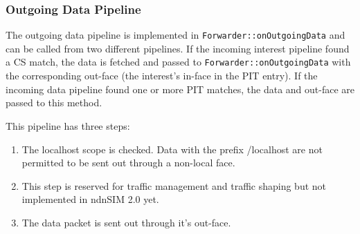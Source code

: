 \subsubsection{Outgoing Data Pipeline}

The outgoing data pipeline is implemented in \texttt{Forwarder::onOutgoingData} and can be called from two different pipelines. If the incoming interest pipeline found a CS match, the data is fetched and passed to \texttt{Forwarder::onOutgoingData} with the corresponding out-face (the interest's in-face in the PIT entry). If the incoming data pipeline found one or more PIT matches, the data and out-face are passed to this method.

This pipeline has three steps:

\begin{enumerate}
\item The localhost scope is checked. Data with the prefix /localhost are not permitted to be sent out through a non-local face.
\item This step is reserved for traffic management and traffic shaping but not implemented in ndnSIM 2.0 yet.
\item The data packet is sent out through it's out-face.
\end{enumerate}


